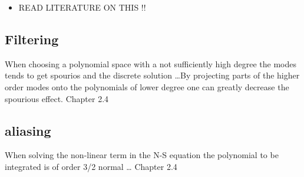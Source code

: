 
\begin{itemize}
\item READ LITERATURE ON THIS !! 
\end{itemize}
\subsection{Filtering}
When choosing a polynomial space with a not sufficiently high degree the modes tends to get spourios and the discrete solution 
\ldots By projecting parts of the higher order modes onto the polynomials of lower degree one can greatly decrease the spourious effect.
\cite{Karniadakis} Chapter 2.4
\subsection{aliasing}
When solving the non-linear term in the N-S equation the polynomial to be integrated is of order 3/2 normal \ldots
\cite{Karniadakis} Chapter 2.4


